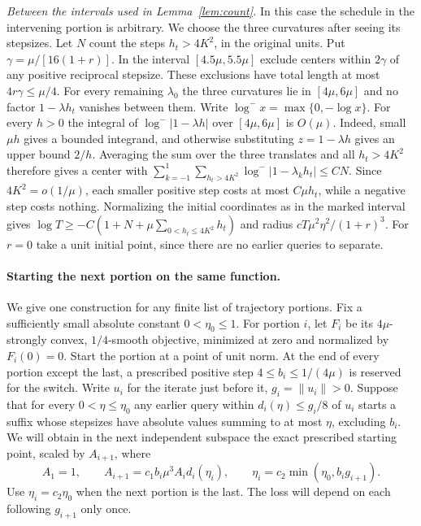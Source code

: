 \documentclass[11pt]{article}
\theoremstyle{definition}
\begin{document}
\emph{Between the intervals used in Lemma~\ref{lem:count}.} In this case the schedule in the intervening portion is arbitrary. We choose the three curvatures after seeing its stepsizes.
Let \(N\) count the steps \(h_t>4K^2\), in the original units.
Put \(\gamma=\mu/[16(1+r)]\). In the interval
\([4.5\mu,5.5\mu]\) exclude centers within \(2\gamma\) of any
positive reciprocal stepsize. These exclusions have total length at
most \(4r\gamma\le\mu/4\). For every remaining \(\lambda_0\) the
three curvatures lie in \([4\mu,6\mu]\) and no factor \(1-\lambda h_t\)
vanishes between them.
Write \(\log^- x=\max\{0,-\log x\}\). For every \(h>0\) the integral of \(\log^-|1-\lambda h|\) over
\([4\mu,6\mu]\) is \(O(\mu)\). Indeed, small \(\mu h\) gives a bounded
integrand, and otherwise substituting \(z=1-\lambda h\) gives
an upper bound \(2/h\). Averaging the sum over the three translates
and all \(h_t>4K^2\) therefore gives a center with
\(\sum_{k=-1}^1\sum_{h_t>4K^2}\log^-|1-\lambda_k h_t|\le C N\).
Since \(4K^2=o(1/\mu)\), each smaller positive step costs at most \(C\mu h_t\), while a
negative step costs nothing. Normalizing the initial coordinates
as in the marked interval gives
\(\log T\ge-C(1+N+\mu\sum_{0<h_t\le4K^2}h_t)\) and radius
\(cT\mu^2\eta^2/(1+r)^3\). For \(r=0\) take a unit initial point, since
there are no earlier queries to separate.

\paragraph{Starting the next portion on the same function.}\label{app:reset}\label{app:stages}
We give one construction for any finite list of trajectory portions.
Fix a sufficiently small absolute constant \(0<\eta_0\le1\).
For portion \(i\), let \(F_i\) be its \(4\mu\)-strongly convex,
\(1/4\)-smooth objective, minimized at zero and normalized by \(F_i(0)=0\).
Start the portion at a point of unit norm. At the end of every portion except
the last, a prescribed positive step \(4\le b_i\le1/(4\mu)\) is
reserved for the switch. Write \(u_i\) for the iterate just before it,
\(g_i=\|u_i\|>0\). Suppose that for every \(0<\eta\le\eta_0\)
any earlier query within \(d_i(\eta)\le g_i/8\) of \(u_i\)
starts a suffix whose stepsizes have absolute values summing to at most \(\eta\), excluding
\(b_i\). We will obtain in the next independent subspace the exact
prescribed starting point, scaled by \(A_{i+1}\), where
\[
 A_1=1,\qquad A_{i+1}=c_1b_i\mu^3 A_i d_i(\eta_i),\qquad
 \eta_i=c_2\min(\eta_0,b_i g_{i+1}).
\]
Use \(\eta_i=c_2\eta_0\) when the next portion is the last.
The loss will depend on each following \(g_{i+1}\) only once.
\end{document}
